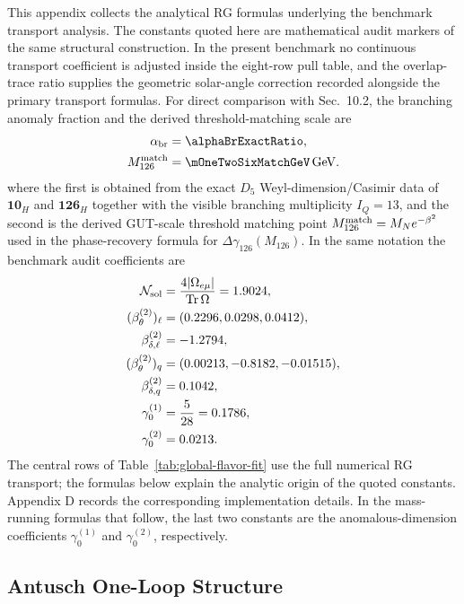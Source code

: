 \documentclass[11pt]{article}
\renewcommand{\Tr}{\operatorname{Tr}}
\begin{document}
This appendix collects the analytical RG formulas underlying the benchmark transport analysis. The constants quoted here are mathematical audit markers of the same structural construction. In the present benchmark no continuous transport coefficient is adjusted inside the eight-row pull table, and the overlap-trace ratio supplies the geometric solar-angle correction recorded alongside the primary transport formulas. For direct comparison with Sec.~10.2, the branching anomaly fraction and the derived threshold-matching scale are
\begin{align}
 \alpha_{\rm br}&=\alphaBrExactRatio, \\
 M_{126}^{\rm match}&=\mOneTwoSixMatchGeV\,\mathrm{GeV}.
\end{align}
where the first is obtained from the exact $D_5$ Weyl-dimension/Casimir data of $\mathbf{10}_H$ and $\mathbf{126}_H$ together with the visible branching multiplicity $I_Q=13$, and the second is the derived GUT-scale threshold matching point $M_{126}^{\rm match}=M_Ne^{-\beta^2}$ used in the phase-recovery formula for $\Delta\gamma_{126}(M_{126})$. In the same notation the benchmark audit coefficients are
\begin{align}
 \mathcal N_{\rm sol}&=\frac{4|\Omega_{e\mu}|}{\Tr\Omega}=1.9024, \\
 (\beta_{\theta}^{(2)})_{\ell}&=(0.2296,0.0298,0.0412), \\
 \beta_{\delta,\ell}^{(2)}&=-1.2794, \\
 (\beta_{\theta}^{(2)})_q&=(0.00213,-0.8182,-0.01515), \\
 \beta_{\delta,q}^{(2)}&=0.1042, \\
 \gamma_0^{(1)}&=\frac{5}{28}=0.1786, \\
 \gamma_0^{(2)}&=0.0213.
\end{align}
The central rows of Table~\ref{tab:global-flavor-fit} use the full numerical RG transport; the formulas below explain the analytic origin of the quoted constants. Appendix D records the corresponding implementation details. In the mass-running formulas that follow, the last two constants are the anomalous-dimension coefficients $\gamma_0^{(1)}$ and $\gamma_0^{(2)}$, respectively.

\subsection{Antusch One-Loop Structure}
\end{document}
